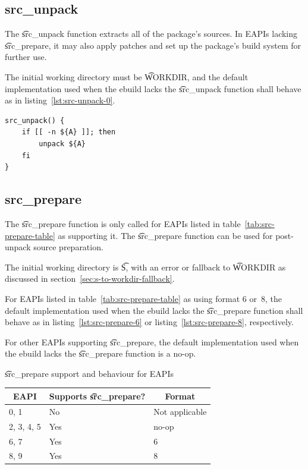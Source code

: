 \subsection{src_unpack}

The \t{src_unpack} function extracts all of the package's sources. In EAPIs lacking
\t{src_prepare}, it may also apply patches and set up the package's build system for further use.

The initial working directory must be \t{WORKDIR}, and the default implementation used when
the ebuild lacks the \t{src_unpack} function shall behave as in listing~\ref{lst:src-unpack-0}.

\begin{listing}[H]
\caption{\t{src_unpack}} \label{lst:src-unpack-0}
\begin{verbatim}
src_unpack() {
    if [[ -n ${A} ]]; then
        unpack ${A}
    fi
}
\end{verbatim}
\end{listing}

\subsection{src_prepare}

 The \t{src_prepare} function is only called for EAPIs listed in
table~\ref{tab:src-prepare-table} as supporting it. The \t{src_prepare} function can be used for
post-unpack source preparation.

The initial working directory is \t{S}, with an error or fallback to \t{WORKDIR} as discussed in
section~\ref{sec:s-to-workdir-fallback}.

For EAPIs listed in table~\ref{tab:src-prepare-table} as using format 6 or~8, the default
implementation used when the ebuild lacks the \t{src_prepare} function shall behave as in
listing~\ref{lst:src-prepare-6} or listing~\ref{lst:src-prepare-8}, respectively.

For other EAPIs supporting \t{src_prepare}, the default implementation used when the ebuild lacks
the \t{src_prepare} function is a no-op.

\begin{centertable}{\t{src_prepare} support and behaviour for EAPIs}
    \label{tab:src-prepare-table}
    \begin{tabular}{lll}
      \toprule
      \multicolumn{1}{c}{\textbf{EAPI}} &
      \multicolumn{1}{c}{\textbf{Supports \t{src_prepare}?}} &
      \multicolumn{1}{c}{\textbf{Format}} \\
      \midrule
      0, 1              & No  & Not applicable \\
      2, 3, 4, 5        & Yes & no-op          \\
      6, 7              & Yes & 6              \\
      8, 9              & Yes & 8              \\
      \bottomrule
    \end{tabular}
\end{centertable}


